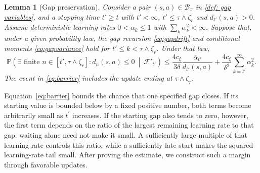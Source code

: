 \documentclass[twoside,11pt]{article}
\newtheorem{lemma}[lemma]{Lemma}
\DeclareRobustCommand{\reviewbarstart}{%
  \ifhmode %
    \vadjust{\vbox to 0pt{%
      \vskip-\ht\strutbox %
      \vskip-\dp\strutbox %
      \cbstart[\changebarwidth] %
      \vss %
    }}%
  \else %
    \cbstart[\changebarwidth]%
  \fi %
} %
\providecommand{\DIFadd}[1]{#1} %
\providecommand{\DIFaddbegin}{\reviewbarstart} %
\providecommand{\DIFaddend}{\protect\cbend} %
\def\DIFadd#1{#1}%
\def\DIFaddbegin{}%
\def\DIFaddend{}%
\begin{document}
 \DIFaddbegin \begin{lemma}[Gap preservation]
\label{lem:barrier}
\DIFadd{Consider a }\DIFaddend pair  \DIFaddbegin \DIFadd{$(s,a)\in\mathcal B_\pi$ in \autoref{def: gap variables}, and a stopping time $t'\ge t$ with $t'<\infty$, $t'\le\tau\wedge\zeta_r$ and $d_{t'}(s,a)>0$.
Assume deterministic learning rates $0<\alpha_k\le1$ with $\sum_k\alpha_k^2<\infty$. Suppose that, under a given probability law, }\DIFaddend the  \DIFaddbegin \DIFadd{gap recursion \eqref{eq:gapdrift} and conditional moments \eqref{eq:gapvariance} hold for $t'\le k<\tau\wedge\zeta_r$. Under that law,
}\begin{equation}
\DIFadd{\label{eq:barrier}
\mathbb P\!\left(\exists\text{ finite }n\in[t',\tau\wedge\zeta_r]:d_n(s,a)\le0\ \middle|\ \mathcal F'_{t'}\right)
\le \frac{4c_\xi}{3\delta}\frac{\bar\alpha_{t'}}{d_{t'}(s,a)}
+\frac{4c_\xi}{\delta^2}\sum_{k=t'}^\infty\alpha_k^2.
}\end{equation}\DIFaddend 
 \DIFaddbegin \DIFadd{The event in \eqref{eq:barrier} includes the update ending at $\tau\wedge\zeta_r$}\DIFaddend .
 \end{lemma}
\DIFaddbegin \DIFadd{Equation~\eqref{eq:barrier} bounds the chance that one specified gap closes. If its starting value is bounded below by a fixed positive number, both terms become arbitrarily small as $t^{\prime}$ increases. If the starting gap also tends to zero, however, the first term depends on the ratio of the largest remaining learning rate to that gap: waiting alone need not make it small. A sufficiently large multiple of that learning rate controls this ratio, while a sufficiently late start makes the squared-learning-rate tail small. After proving the estimate, we construct such a margin through favorable updates.
}\DIFaddend 
\end{document}

